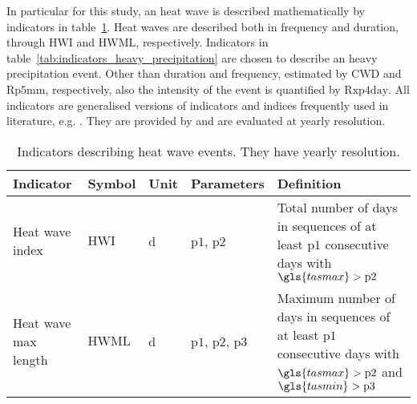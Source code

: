 In particular for this study, an heat wave is described mathematically by \glspl{indicator} in table~\ref{tab:indicators_heat_wave}. Heat waves are described both in frequency and duration, through $\mathrm{HWI}$ and $\mathrm{HWML}$, respectively.
Indicators in table~\ref{tab:indicators_heavy_precipitation} are chosen to describe an heavy precipitation event. Other than duration and frequency, estimated by $\mathrm{CWD}$ and $\mathrm{Rp5mm}$, respectively, also the intensity of the event is quantified by $\mathrm{Rxp4day}$.
All indicators are generalised versions of indicators and indices frequently used in literature, e.g. \cite[2208]{2021GutierrezAnnexVI}. They are provided by \cite{2023BourgaultXclimXarray-based} and are evaluated at yearly resolution.
\begin{table}
  \centering
  \caption{Indicators describing heat wave events. They have yearly resolution.}
  \label{tab:indicators_heat_wave}
  \begin{tabular}{p{}lllp{}}
    Indicator            & Symbol          & Unit        & Parameters                                  & Definition                                                                                                                                        \\
    \hline
    Heat wave index      & $\mathrm{HWI}$  & \unit{\day} & $\mathrm{p1}$, $\mathrm{p2}$                & Total number of days in sequences of at least $\mathrm{p1}$ consecutive days with $\gls{tasmax} > \mathrm{p2}$                                    \\
    Heat wave max length & $\mathrm{HWML}$ & \unit{\day} & $\mathrm{p1}$, $\mathrm{p2}$, $\mathrm{p3}$ & Maximum number of days in sequences of at least $\mathrm{p1}$ consecutive days with $\gls{tasmax} > \mathrm{p2}$ and $\gls{tasmin} > \mathrm{p3}$ \\
  \end{tabular}
\end{table}
